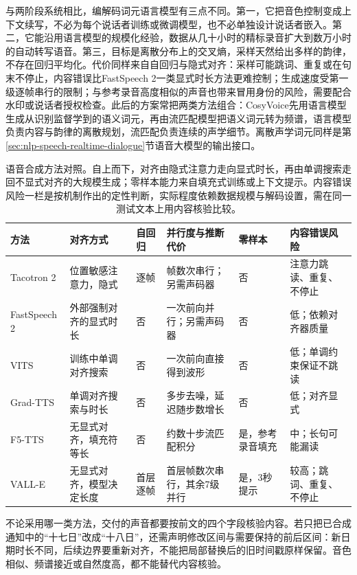 与两阶段系统相比，编解码词元语言模型有三点不同。第一，它把音色控制变成上下文续写，不必为每个说话者训练或微调模型，也不必单独设计说话者嵌入。第二，它能沿用语言模型的规模化经验，数据从几十小时的精标录音扩大到数万小时的自动转写语音。第三，目标是离散分布上的交叉熵，采样天然给出多样的韵律，不存在回归平均化。代价同样来自自回归与隐式对齐：采样可能跳词、重复或在句末不停止，内容错误比FastSpeech 2一类显式时长方法更难控制；生成速度受第一级逐帧串行的限制；与参考录音高度相似的声音也带来冒用身份的风险，需要配合水印或说话者授权检查。此后的方案常把两类方法组合：CosyVoice先用语言模型生成从识别监督学到的语义词元，再由流匹配模型把语义词元转为频谱，语言模型负责内容与韵律的离散规划，流匹配负责连续的声学细节。离散声学词元同样是第\ref{sec:nlp-speech-realtime-dialogue}节语音大模型的输出接口。

\begin{table}[htbp]
  \centering
  \begin{tabularx}{\linewidth}{@{}>{\raggedright\arraybackslash}p{22mm}>{\raggedright\arraybackslash}p{26mm}>{\raggedright\arraybackslash}p{17mm}>{\raggedright\arraybackslash}X>{\raggedright\arraybackslash}p{18mm}>{\raggedright\arraybackslash}X@{}}
    \toprule
    方法 & 对齐方式 & 自回归 & 并行度与推断代价 & 零样本 & 内容错误风险\\
    \midrule
    Tacotron 2 & 位置敏感注意力，隐式 & 逐帧 & 帧数次串行；另需声码器 & 否 & 注意力跳读、重复、不停止\\
    FastSpeech 2 & 外部强制对齐的显式时长 & 否 & 一次前向并行；另需声码器 & 否 & 低；依赖对齐器质量\\
    VITS & 训练中单调对齐搜索 & 否 & 一次前向直接得到波形 & 否 & 低；单调约束保证不跳读\\
    Grad-TTS & 单调对齐搜索与时长 & 否 & 多步去噪，延迟随步数增长 & 否 & 低；对齐显式\\
    F5-TTS & 无显式对齐，填充符等长 & 否 & 约数十步流匹配积分 & 是，参考录音填充 & 中；长句可能漏读\\
    VALL-E & 无显式对齐，模型决定长度 & 首层逐帧 & 首层帧数次串行，其余7级并行 & 是，3秒提示 & 较高；跳词、重复、不停止\\
    \bottomrule
  \end{tabularx}
  \caption{语音合成方法对照。自上而下，对齐由隐式注意力走向显式时长，再由单调搜索走回不显式对齐的大规模生成；零样本能力来自填充式训练或上下文提示。内容错误风险一栏是按机制作出的定性判断，实际程度依赖数据规模与解码设置，需在同一测试文本上用内容核验比较。}
  \label{tab:nlp-speech-tts-methods}
\end{table}
\FloatBarrier

不论采用哪一类方法，交付的声音都要按前文的四个字段核验内容。若只把已合成通知中的“十七日”改成“十八日”，还需声明修改区间与需要保持的前后区间：新日期时长不同，后续边界要重新对齐，不能把局部替换后的旧时间戳原样保留。音色相似、频谱接近或自然度高，都不能替代内容核验。
